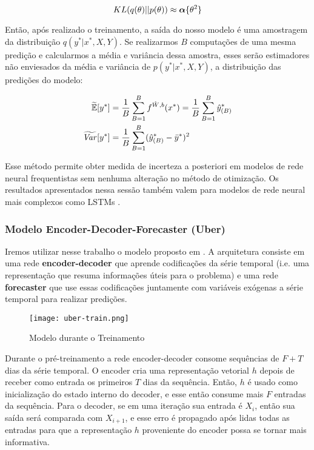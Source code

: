 \begin{equation}
    \mathnormal{KL}(q(\theta) ||p(\theta)) \approx \boldsymbol{\alpha}\{\theta^2\}
 \end{equation} 

Então, após realizado o treinamento, a saída do nosso modelo é uma amostragem da
distribuição $q(y^* | x^*,X,Y)$. Se realizarmos $B$ computações de uma mesma
predição e calcularmos a média e variância dessa amostra, esses serão
estimadores não enviesados da média e variância de $p(y^*|x^*,X,Y)$, a
distribuição das predições do modelo:


\begin{align*}
  \label{eq:aproxs}
  \widetilde{\mathbb{E}}[y^*] &=
   \frac{1}{B}\sum^B_{B=1}\mathnormal{f}^{\hat{W},b}(x^*) = \frac{1}{B}\sum^B_{B=1}\hat{y}^*_{(B)}\\ 
   \widetilde{\mathit{Var}}[y^*]  &= \frac{1}{B}\sum^B_{B=1}(\hat{y}^*_{(B)} - \bar{y}^*)^2 
 \end{align*}


Esse método permite obter medida de incerteza a posteriori em modelos de rede
neural frequentistas sem nenhuma alteração no método de otimização.
Os resultados apresentados nessa sessão também valem para modelos de rede neural
mais complexos como LSTMs \citep{dropbayes}.
 
\subsubsection{Modelo Encoder-Decoder-Forecaster (Uber)}

Iremos utilizar nesse trabalho o modelo proposto em \citep{ubertime}. A
arquitetura consiste em uma rede \textbf{encoder-decoder} que aprende codificações da
série temporal (i.e. uma representação que resuma informações úteis para o
problema) e uma rede \textbf{forecaster} que use essas codificações juntamente com
variáveis exógenas a série temporal para realizar predições.  \\ 



\begin{figure}[H]
\centering
\texttt{[image: uber-train.png]}
\caption{Modelo durante o Treinamento \citep{ubertime}}
\label{img:uber1}
\end{figure}


Durante o pré-treinamento a rede encoder-decoder consome sequências de $F + T$ dias
da série temporal. O encoder cria uma representação vetorial $h$ depois de
receber como entrada os primeiros $T$ dias da sequência. Então, $h$ é usado como
inicialização do estado interno do decoder, e esse então consume mais $F$
entradas da sequência. Para o decoder, se em uma iteração sua entrada é $X_i$,
então sua saída será comparada com $X_{i+1}$, e esse erro é propagado após lidas
todas as entradas para que a representação $h$ proveniente do encoder possa se
tornar mais informativa. \\


